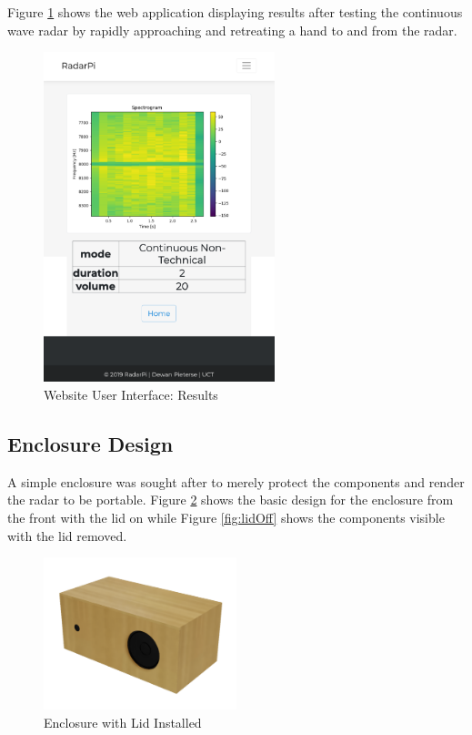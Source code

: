 Figure \ref{fig:website2} shows the web application displaying results after testing the continuous wave radar by rapidly approaching and retreating a hand to and from the radar.

\begin{figure}[h!]
    \centering
    \includegraphics[width = 0.6\textwidth]{images/website2.pdf}
    \caption{Website User Interface: Results}\label{fig:website2}
\end{figure}

\subsection{Enclosure Design\label{enclosureDesign}}
A simple enclosure was sought after to merely protect the components and render the radar to be portable. Figure \ref{fig:lidOn} shows the basic design for the enclosure from the front with the lid on while Figure \ref{fig:lidOff} shows the components visible with the lid removed.

\begin{figure}[h!]
    \centering
    \includegraphics[width = 0.5\textwidth]{images/lidOn.pdf}
    \caption{Enclosure with Lid Installed}\label{fig:lidOn}
\end{figure}

